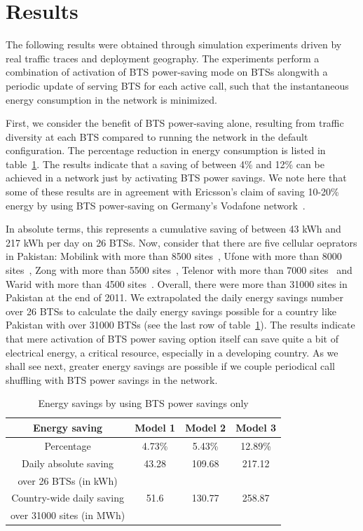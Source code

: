 \section{Results}
\label{sec:results}
The following results were obtained through simulation experiments driven by real traffic traces and deployment geography. The experiments perform a combination of activation of BTS power-saving mode on BTSs alongwith a periodic update of serving BTS for each active call, such that the instantaneous energy consumption in the network is minimized.

First, we consider the benefit of BTS power-saving alone, resulting from traffic diversity at each BTS compared to running the network in the default configuration. The percentage reduction in energy consumption is listed in table~\ref{tab:psonly}. The results indicate that a saving of between 4\% and 12\% can be achieved in a network just by activating BTS power savings. We note here that some of these results are in agreement with Ericsson's claim of saving 10-20\% energy by using BTS power-saving on Germany's Vodafone network~\cite{ericssonclaim}. 

In absolute terms, this represents a cumulative saving of between 43 kWh and 217 kWh per day on 26 BTSs. Now, consider that there are five cellular oeprators in Pakistan: Mobilink with more than 8500 sites~\cite{mobilinksitecount}, Ufone with more than 8000 sites~\cite{ptaannreport}, Zong with more than 5500 sites~\cite{ptaannreport}, Telenor with more than 7000 sites~\cite{telenorsitecount} and Warid with more than 4500 sites~\cite{ptaannreport}. Overall, there were more than 31000 sites in Pakistan at the end of 2011. We extrapolated the daily energy savings number over 26 BTSs to calculate the daily energy savings possible for a country like Pakistan with over 31000 BTSs (see the last row of table~\ref{tab:psonly}). The results indicate that mere activation of BTS power saving option itself can save quite a bit of electrical energy, a critical resource, especially in a developing country. As we shall see next, greater energy savings are possible if we couple periodical call shuffling with BTS power savings in the network. 

\begin{table}
\centering
\begin{tabular}{|c|c|c|c|}
\hline Energy saving & Model 1 & Model 2 & Model 3 \\
\hline Percentage & 4.73\% & 5.43\% & 12.89\% \\
\hline Daily absolute saving & 43.28 & 109.68 & 217.12 \\
over 26 BTSs (in kWh) & \ & \ & \ \\
\hline Country-wide daily saving & 51.6 & 130.77 & 258.87\\
over 31000 sites (in MWh) & \ & \ & \ \\
\hline
\end{tabular}
\caption{Energy savings by using BTS power savings only}
\label{tab:psonly}
\end{table}


